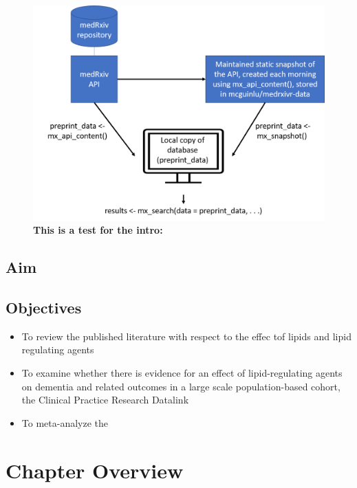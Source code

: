 \documentclass[a4paper, twoside]{templates/ociamthesis}
\providecommand{\tightlist}{%
  \setlength{\itemsep}{0pt}\setlength{\parskip}{0pt}}
\begin{document}
\begin{figure}
\includegraphics[width=1\linewidth]{figures/sys-rev-tools/data_sources} \caption[This is a test for the intro]{\textbf{This is a test for the intro:}}\label{fig:test2}
\end{figure}

\hypertarget{aim}{%
\subsection{Aim}\label{aim}}

\hypertarget{objectives}{%
\subsection{Objectives}\label{objectives}}

\begin{itemize}
\tightlist
\item
  To review the published literature with respect to the effec tof lipids and lipid regulating agents\\
\item
  To examine whether there is evidence for an effect of lipid-regulating agents on dementia and related outcomes in a large scale population-based cohort, the Clinical Practice Research Datalink
\item
  To meta-analyze the
\end{itemize}

\hypertarget{chapter-overview}{%
\section{Chapter Overview}\label{chapter-overview}}
\end{document}
